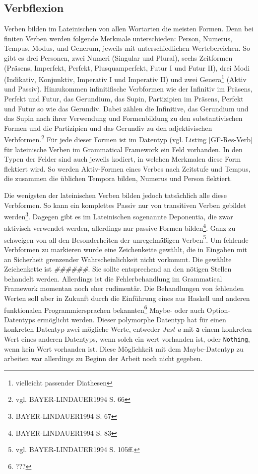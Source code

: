 \documentclass[12pt,abstract=on]{scrreprt}
\begin{document}
\subsection{Verbflexion}
Verben bilden im Lateinischen von allen Wortarten die meisten Formen. Denn bei finiten Verben werden folgende Merkmale unterschieden: Person, Numerus, Tempus, Modus, und Generum, jeweils mit unterschiedlichen Wertebereichen. So gibt es drei Personen, zwei Numeri (Singular und Plural), sechs Zeitformen (Präsens, Imperfekt, Perfekt, Plusquamperfekt, Futur I und Futur II), drei Modi (Indikativ, Konjunktiv, Imperativ I und Imperativ II) und zwei Genera\footnote{vielleicht passender Diathesen} (Aktiv und Passiv). Hinzukommen infinitifische Verbformen wie der Infinitiv im Präsens, Perfekt und Futur, das Gerundium, das Supin, Partizipien im Präsens, Perfekt und Futur so wie das Gerundiv. Dabei zählen die Infinitive, das Gerundium und das Supin nach ihrer Verwendung und Formenbildung zu den substantivischen Formen und die Partizipien und das Gerundiv zu den adjektivischen Verbformen.\footnote{vgl. BAYER-LINDAUER1994 S. 66} Für jede dieser Formen ist im Datentyp (vgl. Listing \ref{GF-Res-Verb} für lateinische Verben im Grammatical Framework ein Feld vorhanden. In den Typen der Felder sind auch jeweils kodiert, in welchen Merkmalen diese Form flektiert wird. So werden Aktiv-Formen eines Verbes nach Zeitstufe und Tempus, die zusammen die üblichen Tempora bilden, Numerus und Person flektiert.  \par
Die wenigsten der lateinischen Verben bilden jedoch tatsächlich alle diese Verbformen. So kann ein komplettes Passiv nur von transitiven Verben gebildet werden\footnote{BAYER-LINDAUER1994 S. 67}. Dagegen gibt es im Lateinischen sogenannte Deponentia, die zwar aktivisch verwendet werden, allerdings nur passive Formen bilden\footnote{BAYER-LINDAUER1994 S. 83}. Ganz zu schweigen von all den Besonderheiten der unregelmäßigen Verben\footnote{vgl. BAYER-LINDAUER1994 S. 105ff.}. Um fehlende Verbformen zu markieren wurde eine Zeichenkette gewählt, die in Eingaben mit an Sicherheit grenzender Wahrscheinlichkeit nicht vorkommt. Die gewählte Zeichenkette ist \textit{\#\#\#\#\#\#}. Sie sollte entsprechend an den nötigen Stellen behandelt werden. Allerdings ist die Fehlerbehandlung im Grammatical Framework momentan noch eher rudimentär. Die Behandlungen von fehlenden Werten soll aber in Zukunft durch die Einführung eines aus Haskell und anderen funktionalen Programmiersprachen bekannten\footnote{???} Maybe- oder auch Option-Datentyps ermöglicht werden. Dieser polymorphe Datentyp hat für einen konkreten Datentyp zwei mögliche Werte, entweder \textit{Just a} mit \texttt{a} einem konkreten Wert eines anderen Datentyps, wenn solch ein wert vorhanden ist, oder \texttt{Nothing}, wenn kein Wert vorhanden ist. Diese Möglichkeit mit dem Maybe-Datentyp zu arbeiten war allerdings zu Beginn der Arbeit noch nicht gegeben.\par
\end{document}
